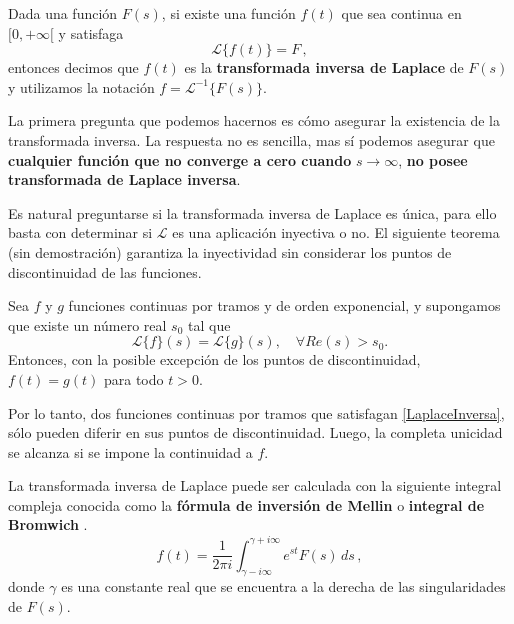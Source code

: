 \begin{defi}
Dada una función $F(s)$, si existe una función $f(t)$ que sea continua en $[0, + \infty[$ y satisfaga
\begin{equation}
\mathcal{L}\{f(t)\} = F \, , \label{LaplaceInversa}
\end{equation}
entonces decimos que $f(t)$ es la \textbf{transformada inversa de Laplace} de $F(s)$ y utilizamos la notación $f = \mathcal{L}^{-1} \{F(s)\}$.
\end{defi}

La primera pregunta que podemos hacernos es cómo asegurar la existencia de la transformada inversa. La respuesta no es sencilla, mas sí podemos asegurar que \textbf{cualquier función que no converge a cero cuando} $s \to \infty$, \textbf{no posee transformada de Laplace inversa}.

Es natural preguntarse si la transformada inversa de Laplace es única, para ello basta con determinar si $\mathcal{L}$ es una aplicación inyectiva o no. El siguiente teorema (sin demostración) garantiza la inyectividad sin considerar los puntos de discontinuidad de las funciones.

\begin{teorema}[de Lerch]
 Sea $f$ y $g$ funciones continuas por tramos y de orden exponencial, y supongamos que existe un número real $s_0$ tal que
\begin{equation*}
\mathcal{L}\{f\}(s) = \mathcal{L}\{g\}(s), \quad \forall Re(s) >s_0.
\end{equation*}
Entonces, con la posible excepción de los puntos de discontinuidad, $f(t) = g(t)$ para todo $t >0$.
\end{teorema}

Por lo tanto, dos funciones continuas por tramos que satisfagan \eqref{LaplaceInversa}, sólo pueden diferir en sus puntos de discontinuidad. Luego, la completa unicidad se alcanza si se impone la continuidad a $f$.


\begin{defi}
    La transformada inversa de Laplace puede ser calculada con la siguiente integral compleja conocida como la \textbf{fórmula de inversión de Mellin} o \textbf{integral de Bromwich} \cite{Arfken}.
    \begin{equation}
        f(t) = \frac{1}{2\pi i} \int_{\gamma - i \infty}^{\gamma + i \infty} e^{st} F(s) \,ds \, ,
    \end{equation}
    donde $\gamma$ es una constante real que se encuentra a la derecha de las singularidades de $F(s)$.
\end{defi}

